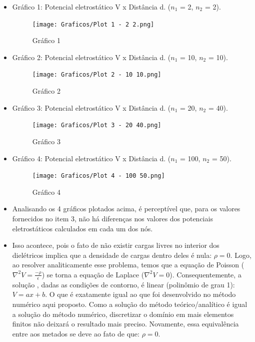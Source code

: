\documentclass[10pt]{article}
\begin{document}
    \begin{itemize}
    \item Gráfico 1: Potencial eletrostático V x Distância d. ($n_{1}$ = 2, $n_{2}$ = 2).
    \begin{figure}[!htb]
    \centerline{\texttt{[image: Graficos/Plot 1 - 2 2.png]}}
    \caption{Gráfico 1}
    \label{fig:f2}
    \end{figure}
    
    \item Gráfico 2: Potencial eletrostático V x Distância d. ($n_{1}$ = 10, $n_{2}$ = 10).
    \begin{figure}[!htb]
    \centerline{\texttt{[image: Graficos/Plot 2 - 10 10.png]}}
    \caption{Gráfico 2}
    \label{fig:f2}
    \end{figure}
    \end{itemize}
    \newpage
    
    \begin{itemize}
    \item Gráfico 3: Potencial eletrostático V x Distância d. ($n_{1}$ = 20, $n_{2}$ = 40).
    \begin{figure}[!htb]
    \centerline{\texttt{[image: Graficos/Plot 3 - 20 40.png]}}
    \caption{Gráfico 3}
    \label{fig:f2}
    \end{figure}
    
    \item Gráfico 4: Potencial eletrostático V x Distância d. ($n_{1}$ = 100, $n_{2}$ = 50).
    \begin{figure}[!htb]
    \centerline{\texttt{[image: Graficos/Plot 4 - 100 50.png]}}
    \caption{Gráfico 4}
    \label{fig:f2}
    \end{figure}
    
    \item Analisando os 4 gráficos plotados acima, é perceptível que, para os valores fornecidos no item 3, não há diferenças nos valores dos potenciais eletrostáticos calculados em cada um dos nós.
    \item Isso acontece, pois o fato de não existir cargas livres no interior dos dielétricos implica que a densidade de cargas dentro deles é nula: $\rho = 0$. Logo, ao resolver analiticamente esse problema, temos que a equação de Poisson ($\nabla^{2}V = \frac{-\rho}{\epsilon}$) se torna a equação de Laplace ($\nabla^{2}V = 0$). Consequentemente, a solução , dadas as condições de contorno,  é linear (polinômio de grau 1): $V = ax + b$. O que é exatamente igual ao que foi desenvolvido no método numérico aqui proposto. Como a solução do método teórico/analítico é igual a solução do método numérico, discretizar o domínio em mais elementos finitos não deixará o resultado mais preciso. Novamente, essa equivalência entre aos metados se deve ao fato de que: $\rho = 0$.
    
    \end{itemize}
    \newpage
\end{document}
